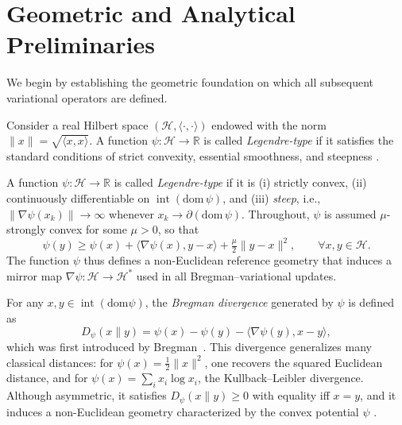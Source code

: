 \documentclass[11pt]{article}
\newcommand{\inner}[2]{\langle #1 , #2 \rangle}
\theoremstyle{plain}
\theoremstyle{definition}
\theoremstyle{remark}
\begin{document}
\section{Geometric and Analytical Preliminaries}
\label{sec:preliminaries}

We begin by establishing the geometric foundation on which all subsequent 
variational operators are defined.


Consider a real Hilbert space $(\mathcal H,\inner{\cdot}{\cdot})$
endowed with the norm $\|x\| = \sqrt{\inner{x}{x}}$.
A function $\psi:\mathcal H\to\mathbb R$ is called \emph{Legendre-type}
if it satisfies the standard conditions of strict convexity,
essential smoothness, and steepness
\cite{Bauschke2011,Rockafellar1970}.


A function $\psi:\mathcal H\to\mathbb R$ is called \emph{Legendre-type} if it is  
(i) strictly convex,  
(ii) continuously differentiable on $\operatorname{int}(\mathrm{dom}\,\psi)$, and  
(iii) \emph{steep}, i.e., $\|\nabla\psi(x_k)\|\!\to\!\infty$ whenever 
$x_k\!\to\!\partial(\mathrm{dom}\,\psi)$.  
Throughout, $\psi$ is assumed $\mu$-strongly convex for some $\mu>0$, so that
\begin{equation}
\psi(y)\ge\psi(x)+\inner{\nabla\psi(x)}{y-x}+\tfrac{\mu}{2}\|y-x\|^2,
\qquad \forall x,y\in\mathcal H.
\label{eq:strong-convexity}
\end{equation}
The function $\psi$ thus defines a non-Euclidean reference geometry 
that induces a mirror map $\nabla\psi:\mathcal H\to\mathcal H^*$ 
used in all Bregman–variational updates.


For any $x,y\in\operatorname{int}(\mathrm{dom}\psi)$, 
the \emph{Bregman divergence} generated by $\psi$ is defined as
\begin{equation}
D_\psi(x\|y)
= \psi(x) - \psi(y) - \inner{\nabla\psi(y)}{x - y},
\label{eq:bregman-divergence}
\end{equation}
which was first introduced by Bregman~\citep{Bregman1967}.
This divergence generalizes many classical distances:
for $\psi(x)=\tfrac12\|x\|^2$, one recovers the squared Euclidean distance,
and for $\psi(x)=\sum_i x_i\log x_i$, the Kullback--Leibler divergence.
Although asymmetric, it satisfies $D_\psi(x\|y)\ge0$ with equality iff $x=y$,
and it induces a non-Euclidean geometry characterized by the convex potential
$\psi$ \citep{Rockafellar1970,Bauschke2011}.
\end{document}
